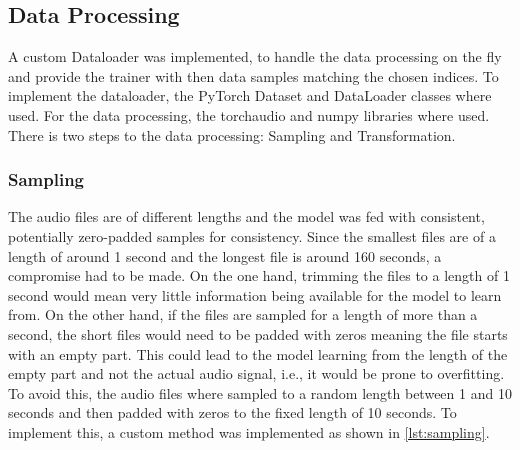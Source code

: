 

\subsection{Data Processing}%
A custom Dataloader was implemented, to handle the data processing on the fly
and provide the trainer with then data samples matching the chosen indices.
To implement the dataloader, the PyTorch Dataset and DataLoader classes where used.
For the data processing, the torchaudio and numpy libraries where used.
There is two steps to the data processing: Sampling and Transformation.

\subsubsection{Sampling}%
The audio files are of different lengths and the model was fed with consistent, potentially zero-padded samples for consistency.
Since the smallest files are of a length of around 1 second and the longest file is around
160 seconds, a compromise had to be made. On the one hand, trimming the files to a length of 1 second
would mean very little information being available for the model to learn from. On the other
hand, if the files are sampled for a length of more than a second, the short files would need
to be padded with zeros meaning the file starts with an empty part. This could lead
to the model learning from the length of the empty part and not the actual audio signal, i.e., it would be prone to overfitting.
To avoid this, the audio files where sampled to a random length between 1 and 10 seconds and
then padded with zeros to the fixed length of 10 seconds. To implement this, a custom method
was implemented as shown in \autoref{lst:sampling}.



